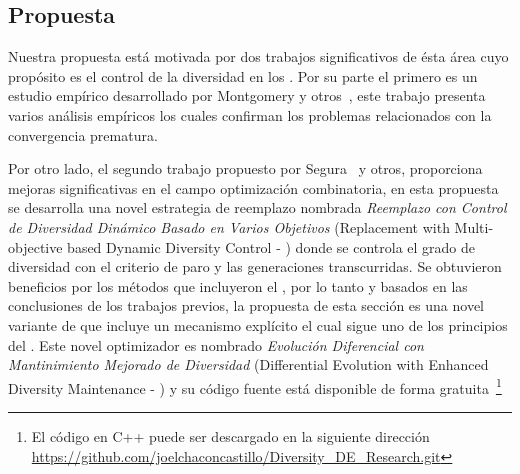 \subsection{Propuesta}

Nuestra propuesta está motivada por dos trabajos significativos de ésta área cuyo propósito es el control de la diversidad en los \EAS{}.
%
Por su parte el primero es un estudio empírico desarrollado por Montgomery y otros~\cite{montgomery2012simple}, este trabajo presenta varios análisis empíricos los cuales confirman los problemas relacionados con la convergencia prematura.

%
Por otro lado, el segundo trabajo propuesto por Segura~\cite{segura2016novel} y otros, proporciona mejoras significativas en el campo optimización combinatoria, en esta propuesta se desarrolla una novel estrategia de reemplazo nombrada \textit{Reemplazo con Control de Diversidad Dinámico Basado en Varios Objetivos} (Replacement with Multi-objective based Dynamic Diversity Control - \RMDDC{}) donde se controla el grado de diversidad con el criterio de paro y las generaciones transcurridas.
%
Se obtuvieron beneficios por los métodos que incluyeron el \RMDDC{}, por lo tanto y basados en las conclusiones de los trabajos previos, la propuesta de esta sección es una novel variante de \DE{} que incluye un mecanismo explícito el cual sigue uno de los principios del \RMDDC{}.
%
Este novel optimizador es nombrado \textit{Evolución Diferencial con Mantinimiento Mejorado de Diversidad} (Differential Evolution with Enhanced Diversity Maintenance - \DEEDM{}) y su código fuente está disponible de forma gratuita~\footnote{El código en C++ puede ser descargado en la siguiente dirección \url{https://github.com/joelchaconcastillo/Diversity\_DE\_Research.git} }



